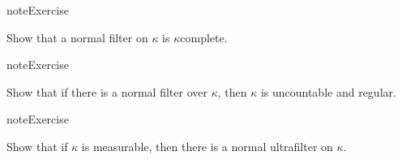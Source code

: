 \documentclass[letterpaper,10pt,english]{jupyterBook}
\begin{document}
\begin{sphinxadmonition}{note}{Exercise}

\sphinxAtStartPar
Show that a normal filter on \(\kappa\) is \(\kappa\)\sphinxhyphen{}complete.
\end{sphinxadmonition}

\begin{sphinxadmonition}{note}{Exercise}

\sphinxAtStartPar
Show that if there is a normal filter over \(\kappa\), then \(\kappa\) is uncountable and regular.
\end{sphinxadmonition}

\begin{sphinxadmonition}{note}{Exercise}

\sphinxAtStartPar
Show that if \(\kappa\) is measurable, then there is a normal ultrafilter on \(\kappa\).
\end{sphinxadmonition}
\end{document}
